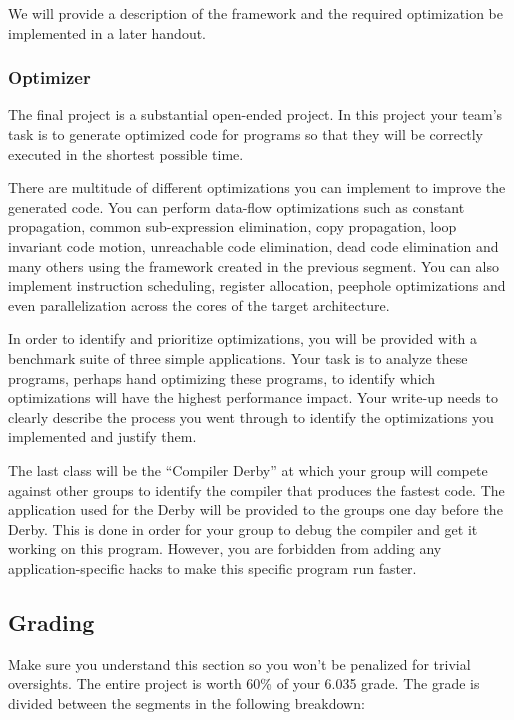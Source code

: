 We will provide a description of the framework and the required optimization
be implemented in a later handout.

\subsubsection*{Optimizer}

The final project is a substantial open-ended project. In this project
your team's task is to generate optimized code for programs so that
they will be correctly executed in the shortest possible time.

There are multitude of different optimizations you can implement to
improve the generated code. You can perform data-flow optimizations
such as constant propagation, common sub-expression elimination, copy
propagation, loop invariant code motion, unreachable code elimination,
dead code elimination and many others using the framework created in
the previous segment. You can also implement instruction scheduling,
register allocation, peephole optimizations and even parallelization
across the cores of the target architecture.

In order to identify and prioritize optimizations, you will be provided
with a benchmark suite of three simple applications.  Your task is to
analyze these programs, perhaps hand optimizing these programs, to
identify which optimizations will have the highest performance
impact. Your write-up needs to clearly describe the process you went
through to identify the optimizations you implemented and justify
them.

The last class will be the ``Compiler Derby'' at which your group
will compete against other groups to identify the compiler that
produces the fastest code. The application used for the Derby will be
provided to the groups one day before the Derby. This is done in order
for your group to debug the compiler and get it working on this
program. However, you are forbidden from adding any
application-specific hacks to make this specific program run faster.


\subsection*{Grading}

Make sure you understand this section so you won't be penalized for
trivial oversights. The entire project is worth 60\% of your 6.035
grade. The grade is divided between the segments in the following breakdown:

